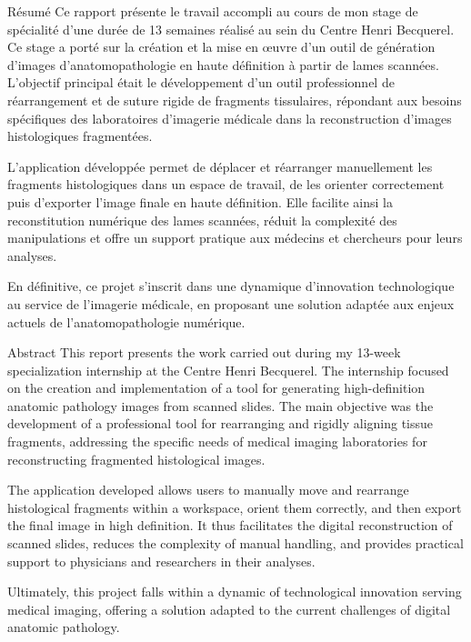 \documentclass[12pt,a4paper]{report}
\begin{document}
\newpage
\thispagestyle{empty}

\begin{resume}{Résumé}
Ce rapport présente le travail accompli au cours de mon stage de spécialité d'une durée de 13 semaines réalisé au sein du Centre Henri Becquerel. Ce stage a porté sur la création et la mise en œuvre d'un outil de génération d'images d'anatomopathologie en haute définition à partir de lames scannées. L'objectif principal était le développement d'un outil professionnel de réarrangement et de suture rigide de fragments tissulaires, répondant aux besoins spécifiques des laboratoires d'imagerie médicale dans la reconstruction d'images histologiques fragmentées.

L'application développée permet de déplacer et réarranger manuellement les fragments histologiques dans un espace de travail, de les orienter correctement puis d'exporter l'image finale en haute définition. Elle facilite ainsi la reconstitution numérique des lames scannées, réduit la complexité des manipulations et offre un support pratique aux médecins et chercheurs pour leurs analyses.

En définitive, ce projet s'inscrit dans une dynamique d'innovation technologique au service de l'imagerie médicale, en proposant une solution adaptée aux enjeux actuels de l'anatomopathologie numérique.
\end{resume}

\begin{resume}{Abstract}
This report presents the work carried out during my 13-week specialization internship at the Centre Henri Becquerel. The internship focused on the creation and implementation of a tool for generating high-definition anatomic pathology images from scanned slides. The main objective was the development of a professional tool for rearranging and rigidly aligning tissue fragments, addressing the specific needs of medical imaging laboratories for reconstructing fragmented histological images.

The application developed allows users to manually move and rearrange histological fragments within a workspace, orient them correctly, and then export the final image in high definition. It thus facilitates the digital reconstruction of scanned slides, reduces the complexity of manual handling, and provides practical support to physicians and researchers in their analyses.

Ultimately, this project falls within a dynamic of technological innovation serving medical imaging, offering a solution adapted to the current challenges of digital anatomic pathology.
\end{resume}
\end{document}
